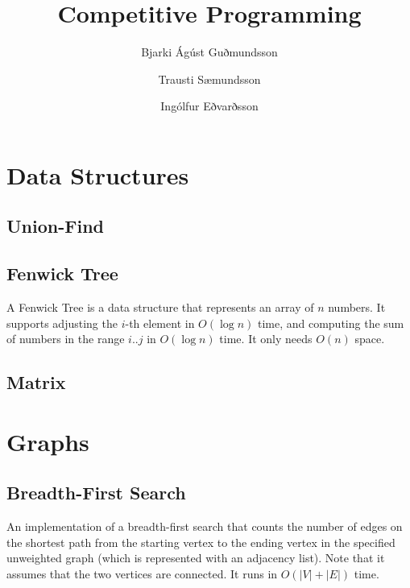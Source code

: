 \documentclass[11pt,a4paper,titlepage]{article}
\title{Competitive Programming}
\author{Bjarki Ágúst Guðmundsson \and Trausti Sæmundsson \and Ingólfur Eðvarðsson}
\begin{document}
	\maketitle
	\tableofcontents
	\newpage

	\section{Data Structures}

		\subsection{Union-Find}
			


		\subsection{Fenwick Tree}
			A Fenwick Tree is a data structure that represents an array of $n$ numbers. It supports adjusting the $i$-th element in $O(\log n)$ time, and computing the sum of numbers in the range $i..j$ in $O(\log n)$ time. It only needs $O(n)$ space.
			


		\subsection{Matrix}
			

	\section{Graphs}

		\subsection{Breadth-First Search}

			An implementation of a breadth-first search that counts the number of edges on the shortest path from the starting vertex to the ending vertex in the specified unweighted graph (which is represented with an adjacency list). Note that it assumes that the two vertices are connected. It runs in $O(|V|+|E|)$ time.
			
\end{document}
